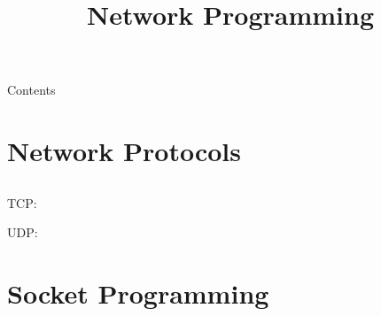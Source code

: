 
\newcommand{\topic}{%
    Network Programming
}

\title{\topic}
\supertitle{\course}
\date{}



\maketitle

\begin{frame}{Contents}
	\tableofcontents
\end{frame}

\section{Network Protocols}
\subsection{}

\begin{frame}
\end{frame}

\begin{frame}
    TCP:
    \begin{itemize}
    \end{itemize}
    UDP:
    \begin{itemize}
    \end{itemize}
\end{frame}

\section{Socket Programming}
\subsection{}

\begin{frame}[Sockets]
\end{frame}



